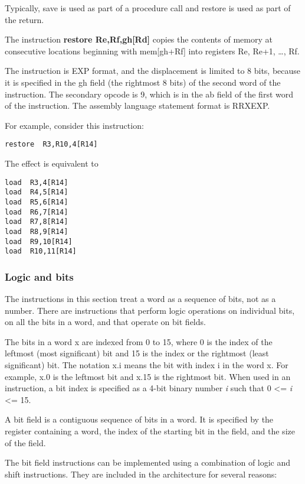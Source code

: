 \documentclass[11pt]{article}
\begin{document}
\begin{itemize}
Typically, save is used as part of a procedure call and restore is
used as part of the return.

The instruction \textbf{restore Re,Rf,gh[Rd]} copies the contents of memory
at consecutive locations beginning with mem[gh+Rf] into registers Re,
Re+1, \ldots{}, Rf.

The instruction is EXP format, and the displacement is limited to 8
bits, because it is specified in the gh field (the rightmost 8 bits)
of the second word of the instruction.  The secondary opcode is 9,
which is in the ab field of the first word of the instruction. The
assembly language statement format is RRXEXP.

For example, consider this instruction:
\begin{verbatim}
restore  R3,R10,4[R14]
\end{verbatim}

The effect is equivalent to

\begin{verbatim}
load  R3,4[R14]
load  R4,5[R14]
load  R5,6[R14]
load  R6,7[R14]
load  R7,8[R14]
load  R8,9[R14]
load  R9,10[R14]
load  R10,11[R14]
\end{verbatim}
\end{itemize}

\subsubsection*{Logic and bits}
\label{sec:org7a045d1}

The instructions in this section treat a word as a sequence of bits,
not as a number.  There are instructions that perform logic operations
on individual bits, on all the bits in a word, and that operate on bit
fields.

The bits in a word x are indexed from 0 to 15, where 0 is the index of
the leftmost (most significant) bit and 15 is the index or the
rightmost (least significant) bit.  The notation x.i means the bit
with index i in the word x.  For example, x.0 is the leftmost bit and
x.15 is the rightmost bit.  When used in an instruction, a bit index
is specified as a 4-bit binary number \emph{i} such that 0 <= \emph{i} <= 15.

A bit field is a contiguous sequence of bits in a word.  It is
specified by the register containing a word, the index of the starting
bit in the field, and the size of the field.

The bit field instructions can be implemented using a combination of
logic and shift instructions.  They are included in the architecture
for several reasons:
\end{document}
